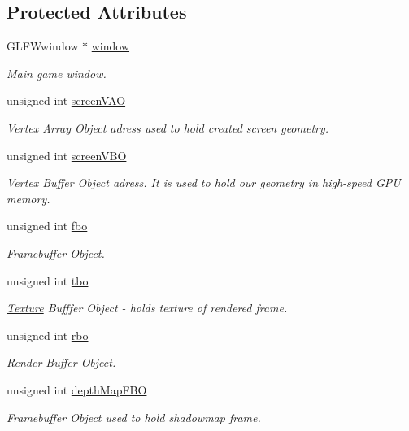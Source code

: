 \subsection*{Protected Attributes}
\begin{DoxyCompactItemize}
\item 
G\+L\+F\+Wwindow $\ast$ \mbox{\hyperlink{class_game_ad9bc7cf39168a1ceaf77d6177116aa94}{window}}
\begin{DoxyCompactList}\small\item\em Main game window. \end{DoxyCompactList}\item 
unsigned int \mbox{\hyperlink{class_game_a92aabad09ef89df6964b62b89c2f7edb}{screen\+V\+AO}}
\begin{DoxyCompactList}\small\item\em Vertex Array Object adress used to hold created screen geometry. \end{DoxyCompactList}\item 
unsigned int \mbox{\hyperlink{class_game_a64dfde0688161bc1d584fc448c496e49}{screen\+V\+BO}}
\begin{DoxyCompactList}\small\item\em Vertex Buffer Object adress. It is used to hold our geometry in high-\/speed G\+PU memory. \end{DoxyCompactList}\item 
unsigned int \mbox{\hyperlink{class_game_a64cdbfe0d81d60426bb6523459d7b52c}{fbo}}
\begin{DoxyCompactList}\small\item\em Framebuffer Object. \end{DoxyCompactList}\item 
unsigned int \mbox{\hyperlink{class_game_af04f4198d017854557726ab48726e709}{tbo}}
\begin{DoxyCompactList}\small\item\em \mbox{\hyperlink{class_texture}{Texture}} Bufffer Object -\/ holds texture of rendered frame. \end{DoxyCompactList}\item 
unsigned int \mbox{\hyperlink{class_game_a521e6ba079b5beb2d552137f9363e36e}{rbo}}
\begin{DoxyCompactList}\small\item\em Render Buffer Object. \end{DoxyCompactList}\item 
unsigned int \mbox{\hyperlink{class_game_aab4586c4a7c0240977381b22808ebfa6}{depth\+Map\+F\+BO}}
\begin{DoxyCompactList}\small\item\em Framebuffer Object used to hold shadowmap frame. \end{DoxyCompactList}\item 

\end{DoxyCompactItemize}
